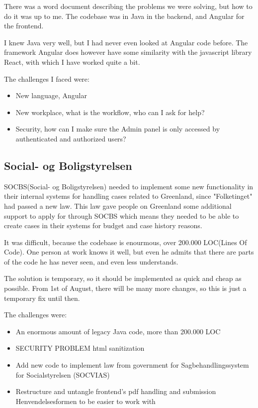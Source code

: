 \documentclass[../main.tex]{subfiles}
\begin{document}
There was a word document describing the problems we were solving, but how to do it was up to me. The codebase was in Java in the backend, and Angular for the frontend. 

I knew Java very well, but I had never even looked at Angular code before. The framework Angular does however have some similarity with the javascript library React, with which I have worked quite a bit.


The challenges I faced were:
\begin{itemize}
    \item New language, Angular
    \item New workplace, what is the workflow, who can I ask for help?
    \item Security, how can I make sure the Admin panel is only accessed by authenticated and authorized users?
\end{itemize}



\subsection{Social- og Boligstyrelsen}
SOCBS(Social- og Boligstyrelsen) needed to implement some new functionality in their internal systems for handling cases related to Greenland, since "Folketinget" had passed a new law. This law gave people on Greenland some additional support to apply for through SOCBS which means they needed to be able to create cases in their systems for budget and case history reasons.

It was difficult, because the codebase is enourmous, over 200.000 LOC(Lines Of Code). One person at work knows it well, but even he admits that there are parts of the code he has never seen, and even less understands.

The solution is temporary, so it should be implemented as quick and cheap as possible. From 1st of August, there will be many more changes, so this is just a temporary fix until then.




The challenges were:
\begin{itemize}
    \item An enormous amount of legacy Java code, more than 200.000 LOC
    \item SECURITY PROBLEM html sanitization 
    \item Add new code to implement law from government for Sagbehandlingssystem for Socialstyrelsen (SOCVIAS) 
    \item Restructure and untangle frontend's pdf handling and submission Henvendelsesformen to be easier to work with
\end{itemize}
\end{document}
